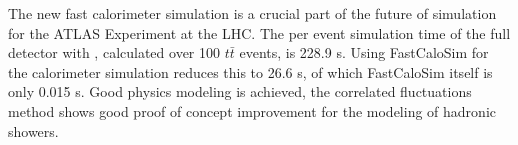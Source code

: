 The new fast calorimeter simulation is a crucial part of the future of simulation for the ATLAS Experiment at the LHC. 
The per event simulation time of the full detector with \GEANT, calculated over 100 $t\bar{t}$ events, is 228.9 s. 
Using FastCaloSim for the calorimeter simulation reduces this to 26.6 s, of which FastCaloSim itself is only 0.015 s. 
Good physics modeling is achieved, the correlated fluctuations method shows good proof of concept improvement for 
the modeling of hadronic showers.




